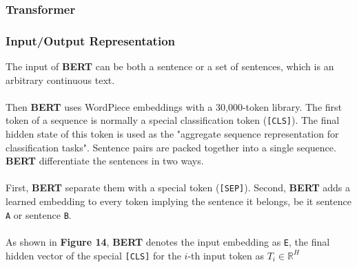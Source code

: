 \documentclass[paper=a4, fontsize=12pt]{scrartcl}
\begin{document}
\subsubsection{Transformer}
\subsubsection{Input/Output Representation}
The input of \textbf{BERT} can be both a sentence or a set of sentences, which is an arbitrary continuous text. \\\\
Then \textbf{BERT} uses WordPiece embeddings with a 30,000-token library. The first token of a sequence is normally a special classification token (\texttt{[CLS]}). The final hidden state of this token is used as the "aggregate sequence representation for classification tasks". Sentence pairs are packed together into a single sequence. \textbf{BERT} differentiate the sentences in two ways. \\\\
 First, \textbf{BERT} separate them with a special token (\texttt{[SEP]}). Second, \textbf{BERT} adds a learned embedding to every token implying the sentence it belongs, be it sentence \texttt{A} or sentence \texttt{B}. \\\\
As shown in \textbf{Figure 14}, \textbf{BERT} denotes the input embedding as \texttt{E}, the final hidden vector of the special \texttt{[CLS]} for the $i$-th input token as $T_i \in \mathbb{R}^H$
\end{document}
